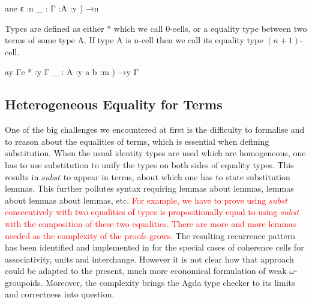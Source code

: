 \documentclass{acm_proc_article-sp}
\newcommand{\wog}{weak $\omega$-groupoids}
\newcommand{\new}{\textcolor{red}}
\begin{document}
\begin{code}%
\>ane
  ε     :n
 \AgdaInductiveConstructor{ \_,}\_   : \AgdaBound{(}Γ :\AgdaBound{(}A :y ) →n
\<%
\end{code}
Types are defined as either $*$ which we
call 0-cells, or a equality type between two terms of some type A. If 
type A is n-cell then we call its equality type $(n+1)$-cell.

\begin{code}%
\>ay Γe
  *     :y Γ
 \_  : \AgdaBound{\{}A :y \AgdaBound{(}a b :m ) →y Γ
\<%
\end{code}

\subsection{Heterogeneous Equality for Terms}

One of the big challenges we encountered at first is the difficulty to
formalise and to reason about the equalities of terms, which is
essential when defining substitution.  When the usual identity types
are used which are homogeneous, one has to use substitution to unify
the types on both sides of equality types. This results in
$\mathit{subst}$ to appear in terms, about which one has to state
substitution lemmas. This further pollutes syntax requiring lemmas
about lemmas, lemmas about lemmas about lemmas, etc. \new{For example, we have to prove using $\mathit{subst}$ consecutively with two equalities of types is propositionally equal to using $\mathit{subst}$ with the composition of these two equalities. There are more and more lemmas needed as the complexity of the proofs grows.} The resulting
recurrence pattern has been identified and implemented in
\cite{txa:csl} for the special cases of coherence cells for
associativity, units and interchange. However it is not clear how that
approach could be adapted to the present, much more economical
formulation of {\wog}. Moreover, the complexity brings the
Agda type checker to its limits and correctness into question.
\end{document}
